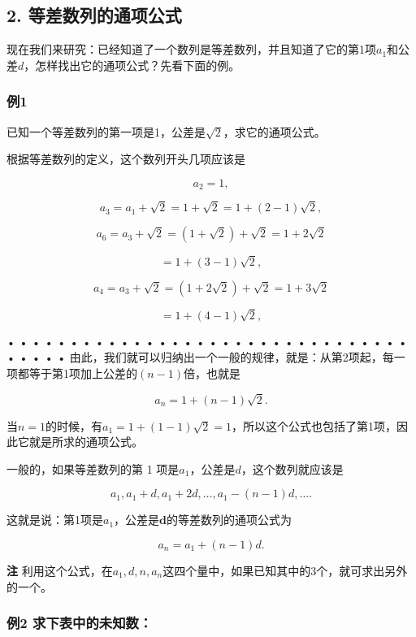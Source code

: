 \subsection{2. 等差数列的通项公式}

现在我们来研究：已经知道了一个数列是等差数列，并且知道了它的第1项\(a_{1}\)和公差\(d\)，怎样找出它的通项公式？先看下面的例。

\subsubsection{例1}

已知一个等差数列的第一项是1，公差是\(\sqrt{2}\)，求它的通项公式。

 根据等差数列的定义，这个数列开头几项应该是

\[
a_{2} = 1,
\]

\[
a_{3} = a_{1} + \sqrt{2} = 1 + \sqrt{2} = 1 + (2 - 1) \sqrt{2},
\]

\[
a_{6} = a_{3} + \sqrt{2} = (1 + \sqrt{2}) + \sqrt{2} = 1 + 2 \sqrt{2}
\]

\[
= 1 + (3 - 1) \sqrt{2},
\]

\[
a_{4} = a_{3} + \sqrt{2} = (1 + 2 \sqrt{2}) + \sqrt{2} = 1 + 3 \sqrt{2}
\]

\[
= 1 + (4 - 1) \sqrt{2},
\]

• • • • • • • • • • • • • • • • • • • • • • • • • • • • • • • • • • • •
•
由此，我们就可以归纳出一个一般的规律，就是：从第2项起，每一项都等于第1项加上公差的\((n - 1)\)倍，也就是

\[
a_{n} = 1 + (n - 1) \sqrt{2}.
\]

当\(n = 1\)的时候，有\(a_1 = 1 + (1 - 1)\sqrt{2} = 1\)，所以这个公式也包括了第1项，因此它就是所求的通项公式。

一般的，如果等差数列的第 1 项是\(a_{1}\)，公差是\(d\)，这个数列就应该是

\[
a_{1}, a_{1} + d, a_{1} + 2 d, \dots, a_{1} - (n - 1) d, \dots.
\]

这就是说：第1项是\(a_1\)，公差是\(\pmb{d}\)的等差数列的通项公式为

\[
a_{n} = a_{1} + (n - 1) d. \tag {I}
\]

\textbf{注}
利用这个公式，在\(a_1, d, n, a_n\)这四个量中，如果已知其中的3个，就可求出另外的一个。

\subsubsection{例2 求下表中的未知数：}

